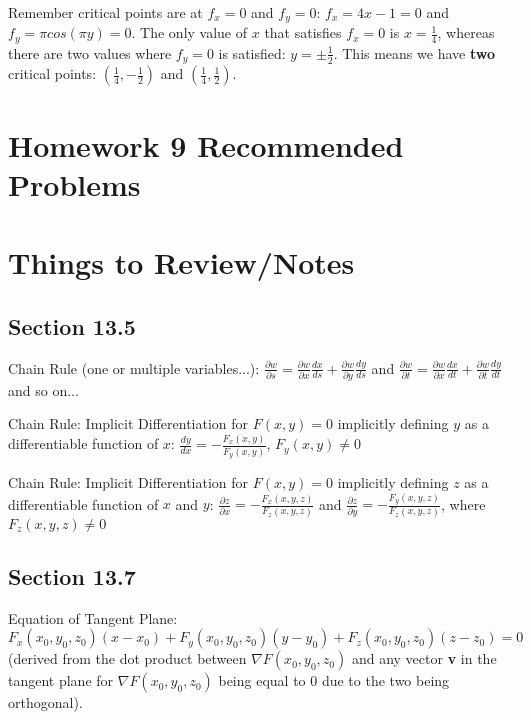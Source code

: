 \documentclass{article}
\begin{document}
\par\noindent\large Remember critical points are at $f_{x} = 0$ and $f_{y} = 0$: $f_{x} = 4x - 1 = 0$ and $f_{y} = \pi cos(\pi y) = 0$.  The only value of $x$ that satisfies $f_{x} = 0$ is $x = \frac{1}{4}$, whereas there are two values where $f_{y} = 0$ is satisfied: $y = \pm\frac{1}{2}$.  This means we have \textbf{two} critical points: $(\frac{1}{4}, -\frac{1}{2})$ and $(\frac{1}{4}, \frac{1}{2})$.

\section{Homework 9 Recommended Problems}

\section{Things to Review/Notes}
\subsection{Section 13.5}
\par\noindent\Large Chain Rule (one or multiple variables...): $\frac{\partial w}{\partial s} = \frac{\partial w}{\partial x}\frac{dx}{ds} + \frac{\partial w}{\partial y}\frac{dy}{ds}$ and $\frac{\partial w}{\partial t} = \frac{\partial w}{\partial x}\frac{dx}{dt} + \frac{\partial w}{\partial t}\frac{dy}{dt}$ and so on...

\par\noindent\Large Chain Rule: Implicit Differentiation for $F(x, y) = 0$ implicitly defining $y$ as a differentiable function of $x$: $\frac{dy}{dx} = -\frac{F_{x}(x, y)}{F_{y}(x, y)}$, $F_{y}(x, y) \neq 0$
\par\noindent\Large Chain Rule: Implicit Differentiation for $F(x, y) = 0$ implicitly defining $z$ as a differentiable function of $x$ and $y$: $\frac{\partial z}{\partial x} = -\frac{F_{x}(x, y, z)}{F_{z}(x, y, z)}$ and $\frac{\partial z}{\partial y} = -\frac{F_{y}(x, y, z)}{F_{z}(x, y, z)}$, where $F_{z}(x, y, z) \neq 0$

\subsection{Section 13.7}
\par\noindent\large Equation of Tangent Plane: $F_{x}(x_{0}, y_{0}, z_{0})(x - x_{0}) + F_{y}(x_{0}, y_{0}, z_{0})(y - y_{0}) + F_{z}(x_{0}, y_{0}, z_{0})(z - z_{0}) = 0$ (derived from the dot product between $\nabla F(x_{0}, y_{0}, z_{0})$ and any vector \textbf{v} in the tangent plane for $\nabla F(x_{0}, y_{0}, z_{0})$ being equal to 0 due to the two being orthogonal).
\end{document}
